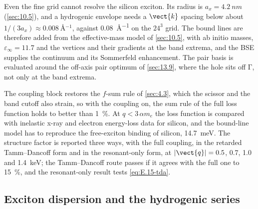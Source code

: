Even the fine grid cannot resolve the silicon exciton. Its radius is $a_x = \SI{4.2}{nm}$ (\cref{sec:10.5}), and a hydrogenic envelope needs a $\vect{k}$ spacing below about $1/(3a_x) \approx \SI{0.008}{\angstrom^{-1}}$, against \SI{0.08}{\angstrom^{-1}} on the $24^3$ grid. The bound lines are therefore added from the effective-mass model of \cref{sec:10.5}, with ab initio masses, $\varepsilon_\infty = 11.7$ and the vertices and their gradients at the band extrema, and the BSE supplies the continuum and its Sommerfeld enhancement. The pair basis is evaluated around the off-axis pair optimum of \cref{sec:13.9}, where the hole sits off $\mathrm{\Gamma}$, not only at the band extrema.

The coupling block restores the $f$-sum rule of \cref{sec:4.3}, which the scissor and the band cutoff also strain, so with the coupling on, the sum rule of the full loss function holds to better than \SI{1}{\percent}. At $q < 3\,\alpha m_e$ the loss function is compared with inelastic x-ray and electron energy-loss data for silicon, and the bound-line model has to reproduce the free-exciton binding of silicon, \SI{14.7}{meV}. The structure factor is reported three ways, with the full coupling, in the retarded Tamm--Dancoff form and in the resonant-only form, at $|\vect{q}| = 0.5$, 0.7, 1.0 and \SI{1.4}{keV}; the Tamm--Dancoff route passes if it agrees with the full one to \SI{15}{\percent}, and the resonant-only result tests \cref{eq:E.15-tda}.

\subsection{Exciton dispersion and the hydrogenic series}


